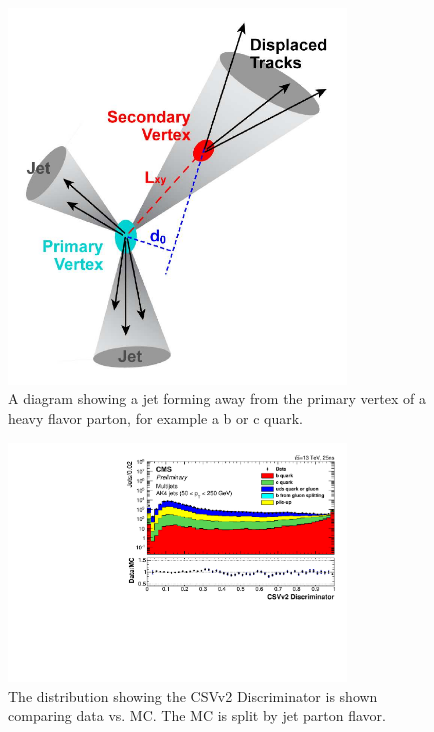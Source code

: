 \begin{figure}[!ht]
  \begin{center}
      \includegraphics[width=0.8\textwidth]{evtsel/figs/secondaryVTX.pdf}
    \caption{
      \label{fig:secondaryVTX}
      A diagram showing a jet forming away from the primary vertex of a heavy flavor parton, for example a b or c quark.
    }
  \end{center}
\end{figure}

\begin{figure}[!ht]
  \begin{center}
      \includegraphics[width=0.8\textwidth]{evtsel/figs/ak4Inclusive_CSVIVF_Log.pdf}
    \caption{
      The distribution showing the CSVv2 Discriminator is shown comparing data vs. MC.
      The MC is split by jet parton flavor.
      \label{fig:csv}
    }
  \end{center}
\end{figure}

